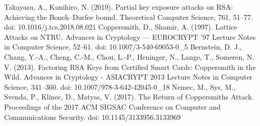 \documentclass{beamer}
\begin{document}
\begin{frame}
{\begin{thebibliography}{11}
        Takayasu, A., Kunihiro, N. (2019). Partial key exposure attacks on RSA: Achieving the Boneh–Durfee bound. Theoretical Computer Science, 761, 51–77. doi: 10.1016/j.tcs.2018.08.021
        Coppersmith, D., Shamir, A. (1997). Lattice Attacks on NTRU. Advances in Cryptology — EUROCRYPT ’97 Lecture Notes in Computer Science, 52–61. doi: 10.1007/3-540-69053-0\_5
        Bernstein, D. J., Chang, Y.-A., Cheng, C.-M., Chou, L.-P., Heninger, N., Lange, T., Someren, N. V. (2013). Factoring RSA Keys from Certified Smart Cards: Coppersmith in the Wild. Advances in Cryptology - ASIACRYPT 2013 Lecture Notes in Computer Science, 341–360. doi: 10.1007/978-3-642-42045-0\_18
        Nemec, M., Sys, M., Svenda, P., Klinec, D., Matyas, V. (2017). The Return of Coppersmiths Attack. Proceedings of the 2017 ACM SIGSAC Conference on Computer and Communications Security. doi: 10.1145/3133956.3133969
	\end{thebibliography}
    }
\end{frame}

\frame{\titlepage}
\end{document}
